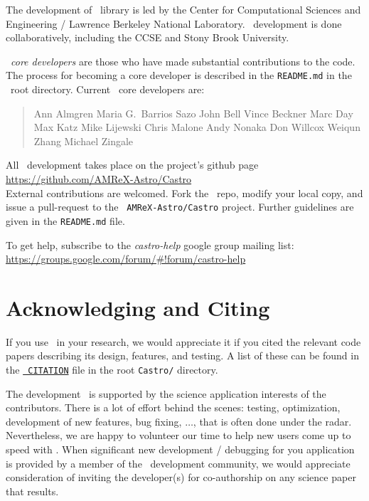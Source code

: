 The development of \amrex\ library is led by the
Center for Computational Sciences and Engineering / Lawrence Berkeley
National Laboratory.  \castro\ development is done collaboratively,
including the CCSE and Stony Brook University.

\castro\ {\em core developers} are those who have made substantial
contributions to the code.  The process for becoming a core developer
is described in the {\tt README.md} in the \castro\ root directory.
Current \castro\ core developers are:

\begin{quote}
Ann Almgren\newline
Maria G.\ Barrios Sazo\newline
John Bell\newline
Vince Beckner\newline
Marc Day\newline
Max Katz\newline
Mike Lijewski\newline
Chris Malone\newline
Andy Nonaka\newline
Don Willcox\newline
Weiqun Zhang\newline
Michael Zingale
\end{quote}

All \castro\ development takes place on the project's github
page\\[0.5em] \url{https://github.com/AMReX-Astro/Castro}\\[0.5em]
External contributions are welcomed.  Fork the \castro\ repo, modify
your local copy, and issue a pull-request to the {\tt
  AMReX-Astro/Castro} project.  Further guidelines are given in the
{\tt README.md} file.

To get help, subscribe to the {\em castro-help} google group mailing list:
\url{https://groups.google.com/forum/#!forum/castro-help}


\section*{Acknowledging and Citing \castro}

If you use \castro\ in your research, we would appreciate it if you
cited the relevant code papers describing its design, features, and
testing.  A list of these can be found in the
\href{https://github.com/AMReX-Astro/Castro/blob/master/CITATION}{\tt
  CITATION} file in the root {\tt Castro/} directory.

The development \castro\ is supported by the science application
interests of the contributors.  There is a lot of effort behind the
scenes: testing, optimization, development of new features, bug
fixing, $\ldots$, that is often done under the radar.  Nevertheless,
we are happy to volunteer our time to help new users come up to speed
with \castro.  When significant new development / debugging for you
application is provided by a member of the \castro\ development
community, we would appreciate consideration of inviting the
developer(s) for co-authorship on any science paper that results.
